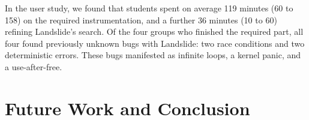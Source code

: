 \documentclass{llncs}
\begin{document}
In the user study, we found that students spent on average 119 minutes (60 to 158) on the required instrumentation, and a further 36 minutes (10 to 60) refining Landslide's search. Of the four groups who finished the required part, all four found previously unknown bugs with Landslide: two race conditions and two deterministic errors. These bugs manifested as infinite loops, a kernel panic, and a use-after-free.

\section{Future Work and Conclusion}



{}

\end{document}
